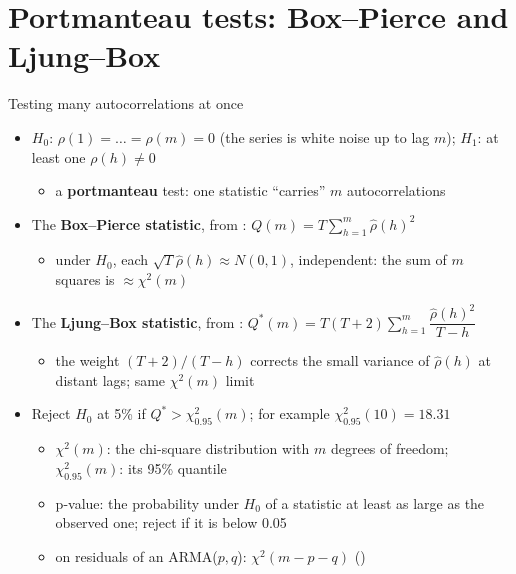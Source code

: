 \section{Portmanteau tests: Box--Pierce and Ljung--Box}

\begin{frame}{Testing many autocorrelations at once}
\itemsize{\small}
\begin{itemize}
    \item $H_0$: $\rho(1) = \dots = \rho(m) = 0$ (the series is white noise up to lag $m$); $H_1$: at least one $\rho(h) \ne 0$
    \begin{itemize}
        \item a \textbf{portmanteau} test: one statistic ``carries'' $m$ autocorrelations
    \end{itemize}
    \item The \textbf{Box--Pierce statistic}, from : $Q(m) = T\sum_{h=1}^{m}\hat\rho(h)^2$
    \begin{itemize}
        \item under $H_0$, each $\sqrt{T}\hat\rho(h) \approx N(0, 1)$, independent: the sum of $m$ squares is $\approx \chi^2(m)$
    \end{itemize}
    \item The \textbf{Ljung--Box statistic}, from : $Q^*(m) = T(T + 2)\sum_{h=1}^{m}\dfrac{\hat\rho(h)^2}{T - h}$
    \begin{itemize}
        \item the weight $(T + 2)/(T - h)$ corrects the small variance of $\hat\rho(h)$ at distant lags; same $\chi^2(m)$ limit
    \end{itemize}
    \item Reject $H_0$ at 5\% if $Q^* > \chi^2_{0.95}(m)$; for example $\chi^2_{0.95}(10) = 18.31$
    \begin{itemize}
        \item $\chi^2(m)$: the chi-square distribution with $m$ degrees of freedom; $\chi^2_{0.95}(m)$: its 95\% quantile
        \item p-value: the probability under $H_0$ of a statistic at least as large as the observed one; reject if it is below 0.05
        \item on residuals of an ARMA($p, q$): $\chi^2(m - p - q)$ ()
    \end{itemize}
\end{itemize}
\end{frame}

